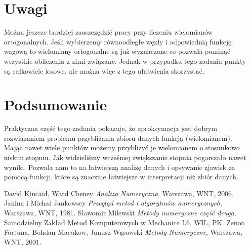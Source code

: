 \documentclass[11pt]{article}
\begin{document}
\section{Uwagi}
Można jeszcze bardziej zaoszczędzić pracy przy liczeniu wielomianów ortogonalnych. Jeśli wybierzemy równoodległe węzły i odpowiednią funkcję wagową to wielomiany ortogonalne są już wyznaczone co pozwala pominąć wszystkie obliczenia z nimi związane. Jednak w przypadku tego zadania punkty są całkowicie losowe, nie można więc z tego ułatwienia skorzystać.
\section{Podsumowanie}
Praktyczna część tego zadania pokazuje, że aproksymacja jest dobrym rozwiązaniem problemu przybliżania zbioru danych funkcją (wielomianem).  Mając nawet wiele punktów możemy przybliżyć je wielomianem o stosunkowo niskim stopniu. Jak widzieliśmy wcześniej zwiększanie stopnia pogarszało nawet wyniki. Pozwala nam to na łatwiejszą analizę danych i opsywanie zjawisk za pomocą funkcji, które są znacznie łatwiejsze w interpretacji niż zbiór danych.

\begin{thebibliography}{9}
 David Kincaid, Ward Cheney
\emph{Analiza Numeryczna},
Warszawa, WNT, 2006.
 Janina i Michał Jankowscy
\emph{Przegląd metod i algorytmów numerycznych},
Warszawa, WNT, 1981.
 Sławomir Milewski
\emph{Metody numeryczne część druga},
Samodzielny Zakład Metod Komputerowych w Mechanice L6, WIL, PK.
 Zenon Fortuna, Bohdan Macukow, Janusz Wąsowski
\emph{Metody Numeryczne},
Warszawa, WNT, 2001.
\end{thebibliography}
\end{document}
